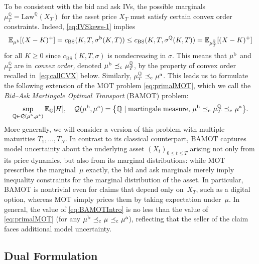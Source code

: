 \documentclass[11pt]{article}
\newcommand{\cQ}{\mathcal{Q}}
\newcommand{\Q}{\mathbb{Q}} %
\theoremstyle{plain}
\theoremstyle{definition}
\theoremstyle{remark}
\newcommand{\E}{\mathbb{E}}
\DeclareMathOperator{\cleq}{\,\preceq_{\rm c}\,}
\theoremstyle{plain}
\begin{document}
To be consistent with the bid and ask IVs, the possible marginals $\mu_T^{\Q} = \text{Law}^{\Q}(X_T)$ for the asset price $X_T$ must satisfy certain convex order constraints. Indeed, \eqref{eq:IVSkews-1} implies
\begin{equation*}
    \E_{\mu^{\rm b}}[(X-K)^+] = c_{\text{BS}}(K,T,  \sigma^{\rm b}(K,T))  \le  c_{\text{BS}}(K,T, \sigma^{\Q}(K,T)) = \E_{\mu^{\Q}_T}[(X-K)^+] %
\end{equation*}
%
%
%
for all $K\ge 0$ since $c_{\text{BS}}(K,T,\sigma)$ is nondecreasing in $\sigma$. This means that $\mu^{\rm b}$ and $\mu_T^{\Q}$ are in \emph{convex order,} denoted $\mu^{\rm b}\cleq\mu_T^{\Q}$, by the property of convex order recalled in~\eqref{eq:callCVX} below. Similarly, $\mu_T^{\Q} \cleq \mu^{\rm a}$.
%
%
%
%
%
%
%
%
%
%
%
%
This leads us to formulate the following extension of the MOT problem \eqref{eq:primalMOT}, which we call the \emph{Bid--Ask Martingale Optimal Transport} (BAMOT) problem:
\begin{equation}\label{eq:BAMOTIntro}
      \sup_{\Q\in \cQ(\mu^{\rm b}, \mu^{\rm a})} \E_{\Q}[H], \quad   \cQ(\mu^{\rm b}, \mu^{\rm a})  = \big\{\Q \mid \text{martingale measure, } \mu^{\rm b}\cleq \mu_T^{\Q} \cleq \mu^{\rm a}\big\}.
\end{equation}
More generally, we will consider a version of this problem with multiple maturities $T_1, \dots, T_N$. In contrast to its  classical counterpart, BAMOT captures model uncertainty about the underlying asset $(X_t)_{0\leq t\leq T}$ arising not only from its price dynamics, but also from its marginal distributions: while MOT prescribes the marginal~$\mu$ exactly, the bid and ask marginals merely imply inequality constraints for the marginal distribution of the asset. In particular, BAMOT is nontrivial even for claims that depend only on~$X_T$, such as a digital option, whereas MOT simply prices them by taking expectation under~$\mu$. In general, the value of \eqref{eq:BAMOTIntro} is no less than the value of \eqref{eq:primalMOT} (for any $\mu^{\rm b}\cleq \mu \cleq \mu^{\rm a}$), reflecting that the seller of the claim faces additional model uncertainty. %


%
%
 
\subsection{Dual Formulation}\label{sec:DualIntro} 
\end{document}
